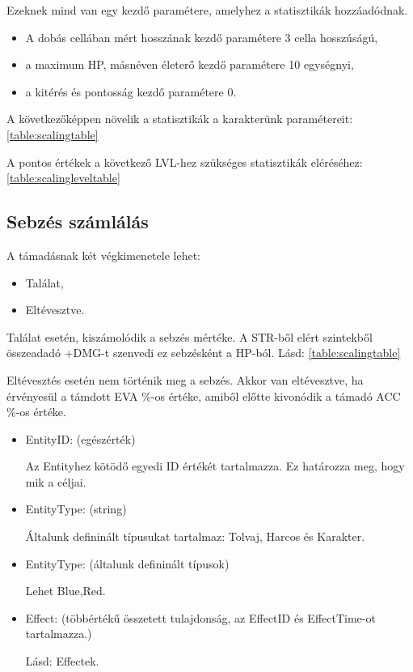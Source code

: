 \noindent Ezeknek mind van egy kezdő paramétere, amelyhez a statisztikák hozzáadódnak.

\begin{itemize}
    \item A dobás cellában mért hosszának kezdő paramétere 3 cella hosszúságú,
    \item a maximum HP, másnéven életerő kezdő paramétere 10 egységnyi,
    \item a kitérés és pontosság kezdő paramétere 0.
\end{itemize}

\noindent A következőképpen növelik a statisztikák a karakterünk paramétereit: \ref{table:scalingtable}

\noindent A pontos értékek a következő LVL-hez szükséges statisztikák eléréséhez: \ref{table:scalingleveltable}

\subsection{Sebzés számlálás}

A támadásnak két végkimenetele lehet:

\begin{itemize}
    \item Találat,
    \item Eltévesztve.
\end{itemize}

\noindent Találat esetén, kiszámolódik a sebzés mértéke. A STR-ből elért szintekből összeadadó +DMG-t szenvedi ez sebzésként a HP-ból. Lásd: \ref{table:scalingtable}

\noindent Eltévesztés esetén nem történik meg a sebzés. Akkor van eltévesztve, ha érvényesül a támdott EVA \%-os értéke, amiből előtte kivonódik a támadó ACC \%-os értéke.


\begin{itemize}
    \item EntityID: (egészérték)
    
    Az Entityhez kötödő egyedi ID értékét tartalmazza. Ez határozza meg, hogy mik a céljai.
    \item EntityType: (string)
    
    Általunk defininált típusukat tartalmaz: Tolvaj, Harcos és Karakter.
    \item EntityType: (általunk defininált típusok)
    
    Lehet Blue,Red.
    \item Effect: (többértékű összetett tulajdonság, az EffectID és EffectTime-ot tartalmazza.)
    
    Lásd: Effectek.
\end{itemize}

